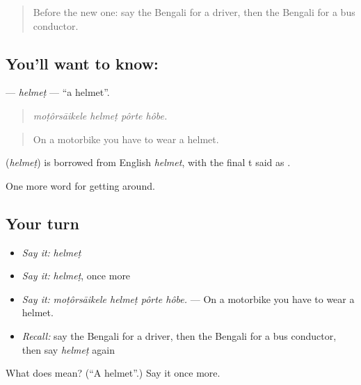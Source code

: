 \begin{quote}
Before the new one: say the Bengali for a driver, then the Bengali for a bus conductor.
\end{quote}

\subsection*{You'll want to know: }
\textbf{} — \emph{helmeṭ} — \textquotedblleft{}a helmet\textquotedblright{}.

\begin{quote}
   
\end{quote}

\begin{quote}
\emph{moṭôrsāikele helmeṭ pôrte hôbe.}
\end{quote}

\begin{quote}
On a motorbike you have to wear a helmet.
\end{quote}

\begin{cousinweb}
\textbf{} (\emph{helmeṭ}) is borrowed from English \emph{helmet}, with the final t said as .
\end{cousinweb}

\begin{grammarlens}[title={What you've built}]
One more word for getting around.
\end{grammarlens}

\subsection*{Your turn}
\begin{itemize}
\raggedright
  \item \emph{Say it:} \emph{helmeṭ}
  \item \emph{Say it:} \emph{helmeṭ}, once more
  \item \emph{Say it:} \emph{moṭôrsāikele helmeṭ pôrte hôbe.} — On a motorbike you have to wear a helmet.
  \item \emph{Recall:} say the Bengali for a driver, then the Bengali for a bus conductor, then say \emph{helmeṭ} again
\end{itemize}

\begin{tcolorbox}[breakable,colback=teal!4,colframe=teal!35!black,title={Before you move on}]
What does  mean? (\textquotedblleft{}A helmet\textquotedblright{}.) Say it once more.
\end{tcolorbox}
